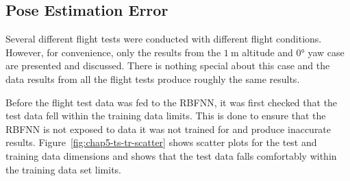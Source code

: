 \subsection{Pose Estimation Error}

Several different flight tests were conducted with different flight conditions. However, for convenience, only the results from the $\SI{1}{\m}$ altitude and $\ang{0}$ yaw case are presented and discussed. There is nothing special about this case and the data results from all the flight tests produce roughly the same results.  

Before the flight test data was fed to the RBFNN, it was first checked that the test data fell within the training data limits. This is done to ensure that the RBFNN is not exposed to data it was not trained for and produce inaccurate results. Figure~\ref{fig:chap5-ts-tr-scatter} shows scatter plots for the test and training data dimensions and shows that the test data falls comfortably within the training data set limits.  

